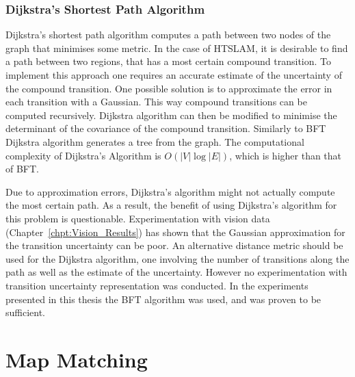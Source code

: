 \subsubsection{Dijkstra's Shortest Path Algorithm}


Dijkstra's shortest path algorithm computes a path between two nodes
of the graph that minimises some metric. In the case of HTSLAM, it is
desirable to find a path between two regions, that has a most certain
compound transition. To implement this approach one requires an
accurate estimate of the uncertainty of the compound transition.  One
possible solution is to approximate the error in each transition with
a Gaussian. This way compound transitions can be computed
recursively. Dijkstra algorithm can then be modified to minimise the
determinant of the covariance of the compound transition. Similarly to
BFT Dijkstra algorithm generates a tree from the graph. The
computational complexity of Dijkstra's Algorithm is $O(|V| \log |E|)$,
which is higher than that of BFT.

Due to approximation errors, Dijkstra's algorithm might not actually
compute the most certain path. As a result, the benefit of using
Dijkstra's algorithm for this problem is questionable. Experimentation
with vision data (Chapter~\ref{chpt:Vision_Results}) has shown that
the Gaussian approximation for the transition uncertainty can be poor.
An alternative distance metric should be used for the Dijkstra
algorithm, one involving the number of transitions along the path as
well as the estimate of the uncertainty. However no experimentation
with transition uncertainty representation was conducted. In the
experiments presented in this thesis the BFT algorithm was used, and
was proven to be sufficient.


\section{Map Matching}
\label{sec:map_matching}


